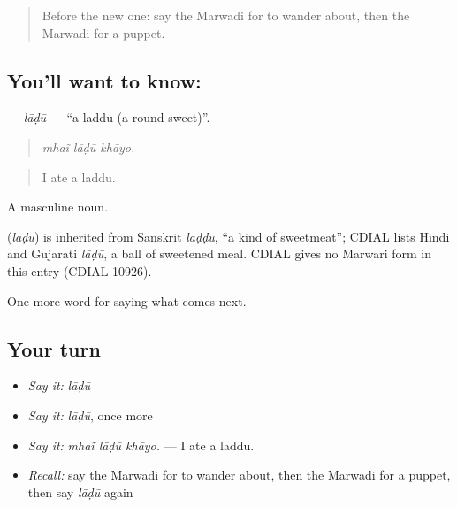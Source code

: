 \label{lesson:MW-C224-ladu}



\begin{quote}
Before the new one: say the Marwadi for to wander about, then the Marwadi for a puppet.
\end{quote}

\subsection*{You'll want to know: }
\textbf{} — \emph{lāḍū} — \textquotedblleft{}a laddu (a round sweet)\textquotedblright{}.

\begin{quote}
  
\end{quote}

\begin{quote}
\emph{mhaĩ lāḍū khāyo.}
\end{quote}

\begin{quote}
I ate a laddu.
\end{quote}

A masculine noun.

\begin{cousinweb}
\textbf{} (\emph{lāḍū}) is inherited from Sanskrit \emph{laḍḍu}, \textquotedblleft{}a kind of sweetmeat\textquotedblright{}; CDIAL lists Hindi and Gujarati \emph{lāḍū}, a ball of sweetened meal. CDIAL gives no Marwari form in this entry (CDIAL 10926).
\end{cousinweb}

\begin{grammarlens}[title={What you've built}]
One more word for saying what comes next.
\end{grammarlens}

\subsection*{Your turn}
\begin{itemize}
\raggedright
  \item \emph{Say it:} \emph{lāḍū}
  \item \emph{Say it:} \emph{lāḍū}, once more
  \item \emph{Say it:} \emph{mhaĩ lāḍū khāyo.} — I ate a laddu.
  \item \emph{Recall:} say the Marwadi for to wander about, then the Marwadi for a puppet, then say \emph{lāḍū} again
\end{itemize}

